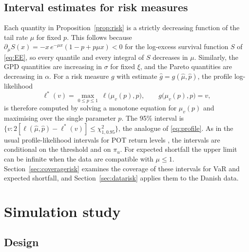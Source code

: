 \documentclass[12pt]{article}
\theoremstyle{definition}
\theoremstyle{remark}
\begin{document}
\subsection{Interval estimates for risk measures}\label{sec:riskci}

Each quantity in Proposition~\ref{prop:risk} is a strictly decreasing function of the tail rate $\mu$ for fixed $p$. This follows because $\partial_\mu S(x)=-x\,e^{-\mu x}(1-p+p\mu x)<0$ for the log-excess survival function $S$ of \eqref{eq:EE}, so every quantile and every integral of $S$ decreases in $\mu$. Similarly, the GPD quantities are increasing in $\sigma$ for fixed $\xi$, and the Pareto quantities are decreasing in $\alpha$. For a risk measure $g$ with estimate $\hat g=g(\hat\mu,\hat p)$, the profile log-likelihood
\[
\ell^*(v)=\max_{0\le p\le1}\ \ell\big(\mu_v(p),p\big),\qquad g\big(\mu_v(p),p\big)=v,
\]
is therefore computed by solving a monotone equation for $\mu_v(p)$ and maximising over the single parameter $p$. The 95\% interval is $\{v:2[\ell(\hat\mu,\hat p)-\ell^*(v)]\le\chi^2_{1,0.95}\}$, the analogue of \eqref{eq:profile}. As in the usual profile-likelihood intervals for POT return levels \citep{Coles2001}, the intervals are conditional on the threshold and on $\pi_u$. For expected shortfall the upper limit can be infinite when the data are compatible with $\mu\le1$. Section~\ref{sec:coveragerisk} examines the coverage of these intervals for VaR and expected shortfall, and Section~\ref{sec:datarisk} applies them to the Danish data.

\section{Simulation study}\label{sec:sim}

\subsection{Design}\label{sec:design}
\end{document}
